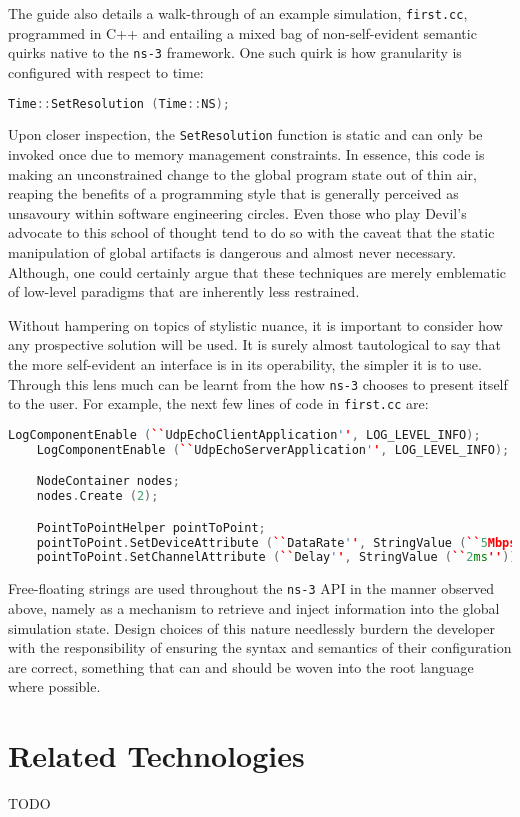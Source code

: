 The guide also details a walk-through of an example simulation, \texttt{first.cc}, programmed in C++ and entailing a
mixed bag of non-self-evident semantic quirks native to the \texttt{ns-3} framework. One such quirk is how
granularity is configured with respect to time:

\begin{lstlisting}[language=C++]
    Time::SetResolution (Time::NS);
\end{lstlisting}

Upon closer inspection, the \texttt{SetResolution} function is static and can only be invoked once due to memory
management constraints. In essence, this code is making an unconstrained change to the global program state out of thin
air, reaping the benefits of a programming style that is generally perceived as unsavoury within software engineering
circles\cite{stack_exchange_static_methods, git_connected_static_methods, medium_static_methods,
    tom_butler_static_methods}. Even those who play Devil's advocate to this school of thought tend to do so with the
caveat that the static manipulation of global artifacts is dangerous and almost never
necessary\cite{java_code_geeks_static_methods}. Although, one could certainly argue that these techniques are merely
emblematic of low-level paradigms that are inherently less restrained.

Without hampering on topics of stylistic nuance, it is important to consider how any prospective solution will be
used. It is surely almost tautological to say that the more self-evident an interface is in its operability, the
simpler it is to use. Through this lens much can be learnt from the how \texttt{ns-3} chooses to present itself to
the user. For example, the next few lines of code in \texttt{first.cc} are:

\begin{lstlisting}[language=C++,firstnumber=2]
    LogComponentEnable (``UdpEchoClientApplication'', LOG_LEVEL_INFO);
    LogComponentEnable (``UdpEchoServerApplication'', LOG_LEVEL_INFO);

    NodeContainer nodes;
    nodes.Create (2);

    PointToPointHelper pointToPoint;
    pointToPoint.SetDeviceAttribute (``DataRate'', StringValue (``5Mbps''));
    pointToPoint.SetChannelAttribute (``Delay'', StringValue (``2ms''));
\end{lstlisting}

Free-floating strings are used throughout the \texttt{ns-3} API in the manner observed above, namely as a mechanism to
retrieve and inject information into the global simulation state. Design choices of this nature needlessly burdern the
developer with the responsibility of ensuring the syntax and semantics of their configuration are correct, something
that can and should be woven into the root language where possible.


\section{Related Technologies}

TODO
